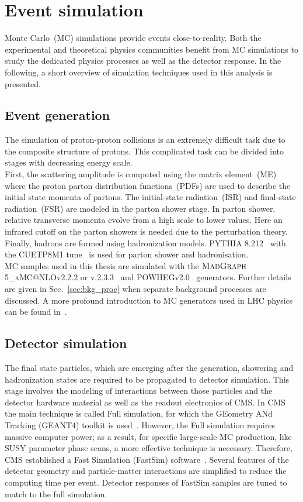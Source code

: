 \section{Event simulation}
\label{sec:simulation}
Monte Carlo~(MC) simulations provide events close-to-reality. Both the experimental and theoretical physics communities benefit from MC simulations to study the dedicated physics processes as well as the detector response.
In the following, a short overview of simulation techniques used in this analysis is presented.
\subsection{Event generation}
The simulation of proton-proton collisions is an extremely difficult task due to the composite structure of protons. This complicated task can be divided into stages with decreasing energy scale.\\
First, the scattering amplitude is computed using the matrix element~(ME) where the proton parton distribution functions~(PDFs) are used to describe the initial state momenta of partons. The initial-state radiation~(ISR) and final-state radiation~(FSR) are modeled in the parton shower stage. In parton shower, relative transverse momenta evolve from a high scale to lower values. Here an infrared cutoff on the parton showers is needed due to the perturbation theory. Finally, hadrons are formed using hadronization models. PYTHIA 8.212~\cite{pythia} with the CUETP8M1 tune~\cite{pythiaTune} is used for parton shower and hadronisation.\\
MC samples used in this thesis are simulated with the $\textsc{MadGraph}$5\_\textsc{aMC@}NLOv2.2.2 or v.2.3.3~\cite{MADGRAPH} and POWHEGv2.0~\cite{POWHEG1,POWHEG2,POWHEG3,POWHEG4,POWHEG5} generators. Further details are given in Sec.~\ref{sec:bkg_proc} when separate background processes are discussed.
A more profound introduction to MC generators used in LHC physics can be found in~\cite{EventGen1}.
\subsection{Detector simulation}
\label{sec:forFastsim}
The final state particles, which are emerging after the generation, showering and hadronization states are required to be propagated to detector simulation.  This stage involves the modeling of interactions between those particles and the detector hardware material as well as the readout electronics of CMS. 
In CMS the main technique is called Full simulation, for which the GEometry ANd Tracking (GEANT4) toolkit is used~\cite{GEANT}.
However, the Full simulation requires massive computer power; as a result, for specific large-scale MC production, like SUSY parameter phase scans, a more effective technique is necessary.
Therefore, CMS established a Fast Simulation (FastSim) software~\cite{fastsim, FastSim2}. Several features of the detector geometry and particle-matter interactions are simplified to reduce the computing time per event. Detector responses of FastSim samples are tuned to match to the full simulation. 
